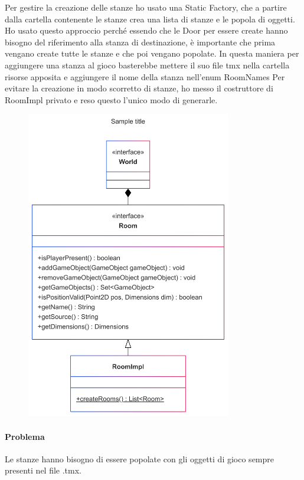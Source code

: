 \documentclass[a4paper,12pt]{report}
\begin{document}
Per gestire la creazione delle stanze ho usato una Static Factory, che a partire dalla cartella contenente le stanze crea una lista di stanze e le popola di oggetti.
Ho usato questo approccio perché essendo che le Door per essere create hanno bisogno del riferimento alla stanza di destinazione, è importante che prima vengano create tutte le stanze e che poi vengano popolate.
In questa maniera per aggiungere una stanza al gioco basterebbe mettere il suo file tmx nella cartella risorse apposita e aggiungere il nome della stanza nell'enum RoomNames
Per evitare la creazione in modo scorretto di stanze, ho messo il costruttore di RoomImpl privato e reso questo l'unico modo di generarle.
\begin{figure} 
    \centering
    \includegraphics[width=0.8\textwidth]{img/Room.png}
    \label{img:Room}
\end{figure}

\paragraph{Problema} %
Le stanze hanno bisogno di essere popolate con gli oggetti di gioco sempre presenti nel file .tmx.
\end{document}

